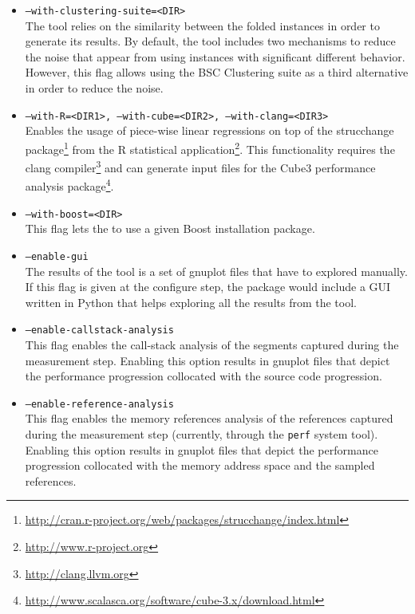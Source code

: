 \begin{itemize}

	\item \texttt{--with-clustering-suite=<DIR>}\\
    The \FOLDING tool relies on the similarity between the folded instances in order to generate its results. By default, the \FOLDING tool includes two mechanisms to reduce the noise that appear from using instances with significant different behavior. However, this flag allows using the BSC Clustering suite as a third alternative in order to reduce the noise.

	\item \texttt{--with-R=<DIR1>, --with-cube=<DIR2>, --with-clang=<DIR3>}\\
	Enables the usage of piece-wise linear regressions on top of the strucchange package\footnote{\url{http://cran.r-project.org/web/packages/strucchange/index.html}} from the R statistical application\footnote{\url{http://www.r-project.org}}. This functionality requires the clang compiler\footnote{\url{http://clang.llvm.org}} and can generate input files for the Cube3 performance analysis package\footnote{\url{http://www.scalasca.org/software/cube-3.x/download.html}}.

	\item \texttt{--with-boost=<DIR>}\\
	This flag lets the \FOLDING to use a given Boost installation package.

	\item \texttt{--enable-gui}\\
	The results of the \FOLDING tool is a set of gnuplot files that have to explored manually. If this flag is given at the configure step, the \FOLDING package would include a GUI written in Python that helps exploring all the results from the tool.

	\item \texttt{--enable-callstack-analysis}\\
	This flag enables the call-stack analysis of the segments captured during the measurement step. Enabling this option results in gnuplot files that depict the performance progression collocated with the source code progression.

	\item \texttt{--enable-reference-analysis}\\
	This flag enables the memory references analysis of the references captured during the measurement step (currently, through the \texttt{perf} system tool). Enabling this option results in gnuplot files that depict the performance progression collocated with the memory address space and the sampled references.

\end{itemize}

